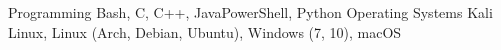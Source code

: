 

\begin{cvskills}

  \cvskill
    {Programming} %
    {Bash, C, C++, JavaPowerShell, Python} %
  \cvskill
    {Operating Systems} %
    {Kali Linux, Linux (Arch, Debian, Ubuntu), Windows (7, 10), macOS} %

\end{cvskills}
